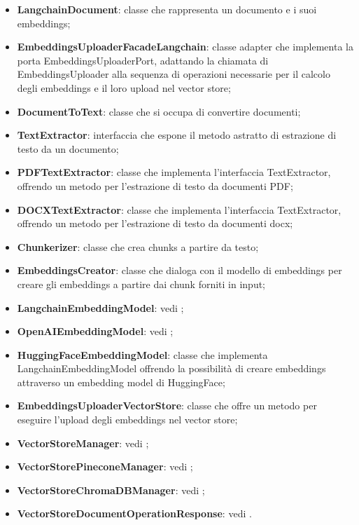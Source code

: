 \documentclass[10pt, a4paper]{article}
\begin{document}
\begin{itemize}
    \item \label{LangchainDocument}\textbf{LangchainDocument}: classe che rappresenta un documento e i suoi embeddings;
    \item \label{EmbeddingsUploaderFacadeLangchain}\textbf{EmbeddingsUploaderFacadeLangchain}: classe adapter che implementa la porta EmbeddingsUploaderPort, adattando la chiamata di EmbeddingsUploader alla sequenza di operazioni necessarie per il calcolo degli embeddings e il loro upload nel vector store;
    \item \label{DocumentToText}\textbf{DocumentToText}: classe che si occupa di convertire documenti;
    \item \label{TextExtractor}\textbf{TextExtractor}: interfaccia che espone il metodo astratto di estrazione di testo da un documento;
    \item \label{PDFTextExtractor}\textbf{PDFTextExtractor}: classe che implementa l'interfaccia TextExtractor, offrendo un metodo per l'estrazione di testo da documenti PDF;
    \item \label{DOCXTextExtractor}\textbf{DOCXTextExtractor}: classe che implementa l'interfaccia TextExtractor, offrendo un metodo per l'estrazione di testo da documenti docx;
    \item \label{Chunkerizer}\textbf{Chunkerizer}: classe che crea chunks a partire da testo;
    \item \label{EmbeddingsCreator}\textbf{EmbeddingsCreator}: classe che dialoga con il modello di embeddings per creare gli embeddings a partire dai chunk forniti in input;
    \item \textbf{LangchainEmbeddingModel}: vedi ;
    \item \textbf{OpenAIEmbeddingModel}: vedi ;
    \item \textbf{HuggingFaceEmbeddingModel}: classe che implementa LangchainEmbeddingModel offrendo la possibilità di creare embeddings attraverso un embedding model di HuggingFace;
    \item \label{EmbeddingsUploaderVectorStore}\textbf{EmbeddingsUploaderVectorStore}: classe che offre un metodo per eseguire l'upload degli embeddings nel vector store;
    \item \textbf{VectorStoreManager}: vedi ;
    \item \textbf{VectorStorePineconeManager}: vedi ;
    \item \textbf{VectorStoreChromaDBManager}: vedi ;
    \item \textbf{VectorStoreDocumentOperationResponse}: vedi .
\end{itemize}
\end{document}
